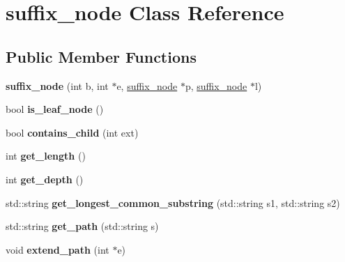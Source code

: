 \hypertarget{classsuffix__node}{}\section{suffix\+\_\+node Class Reference}
\label{classsuffix__node}
\subsection*{Public Member Functions}
\begin{DoxyCompactItemize}
\item 
\mbox{\label{classsuffix__node_a8622127d06af65bd3d16ce5958995b1b}} 
{\bfseries suffix\+\_\+node} (int b, int $\ast$e, \mbox{\hyperlink{classsuffix__node}{suffix\+\_\+node}} $\ast$p, \mbox{\hyperlink{classsuffix__node}{suffix\+\_\+node}} $\ast$l)
\item 
\mbox{\label{classsuffix__node_ab465cab427de4e42b7b917e738b43425}} 
bool {\bfseries is\+\_\+leaf\+\_\+node} ()
\item 
\mbox{\label{classsuffix__node_af00dced817833c98c331293ebe819de5}} 
bool {\bfseries contains\+\_\+child} (int ext)
\item 
\mbox{\label{classsuffix__node_a7b47f09cf1d6a59849dba9fbcb1f3f61}} 
int {\bfseries get\+\_\+length} ()
\item 
\mbox{\label{classsuffix__node_a7fb5c818a596880ac914780e1b8c198f}} 
int {\bfseries get\+\_\+depth} ()
\item 
\mbox{\label{classsuffix__node_a5469454f507f118785f65f206b141c3d}} 
std\+::string {\bfseries get\+\_\+longest\+\_\+common\+\_\+substring} (std\+::string s1, std\+::string s2)
\item 
\mbox{\label{classsuffix__node_aec052c5cffdd951390cdfb40c360908e}} 
std\+::string {\bfseries get\+\_\+path} (std\+::string s)
\item 
\mbox{\label{classsuffix__node_a48933a8d9a3958c56dbbe98ae43deb84}} 
void {\bfseries extend\+\_\+path} (int $\ast$e)
\item 

\end{DoxyCompactItemize}
